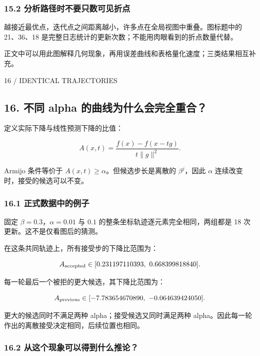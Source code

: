 \documentclass[10pt,a4paper]{article}
\newcommand{\eyebrow}[1]{{\sffamily\fontsize{8.3}{12}\selectfont\color{navy}#1}\par\vspace{4pt}{\color{navy}\hrule height 1pt}\vspace{12pt}}
\begin{document}
\subsubsection{15.2
分析路径时不要只数可见折点}\label{ux5206ux6790ux8defux5f84ux65f6ux4e0dux8981ux53eaux6570ux53efux89c1ux6298ux70b9}

越接近最优点，迭代点之间距离越小，许多点在全局视图中重叠。图标题中的
21、36、18 是完整日志统计的更新次数；不能用肉眼看到的折点数量代替。

正文中可以用此图解释几何现象，再用误差曲线和表格量化速度；三类结果相互补充。

\clearpage

\eyebrow{16 / IDENTICAL TRAJECTORIES}

\subsection{16. 不同 alpha
的曲线为什么会完全重合？}\label{ux4e0dux540c-alpha-ux7684ux66f2ux7ebfux4e3aux4ec0ux4e48ux4f1aux5b8cux5168ux91cdux5408}

定义实际下降与线性预测下降的比值：

\[\boxed{A(x,t)=\frac{f(x)-f(x-tg)}{t\|g\|^2}.}\]

Armijo 条件等价于 \(A(x,t)\ge\alpha\)。但候选步长是离散的
\(\beta^j\)，因此 \(\alpha\) 连续改变时，接受的候选可以不变。

\subsubsection{16.1
正式数据中的例子}\label{ux6b63ux5f0fux6570ux636eux4e2dux7684ux4f8bux5b50}

固定 \(\beta=0.3\)，\(\alpha=0.01\) 与 \(0.1\)
的整条坐标轨迹逐元素完全相同，两组都是 18 次更新。这不是仅看图后的猜测。

在这条共同轨迹上，所有接受步的下降比范围为：

\[A_{\rm accepted}\in[0.231197110393,\ 0.668399818840].\]

每一轮最后一个被拒的更大候选，其下降比范围为：

\[A_{\rm previous}\in[-7.783654670890,\ -0.064639424050].\]

更大的候选同时不满足两种 alpha；接受候选又同时满足两种
alpha。因此每一轮作出的离散接受决定相同，后续位置也相同。

\subsubsection{16.2
从这个现象可以得到什么推论？}\label{ux4eceux8fd9ux4e2aux73b0ux8c61ux53efux4ee5ux5f97ux5230ux4ec0ux4e48ux63a8ux8bba}
\end{document}
